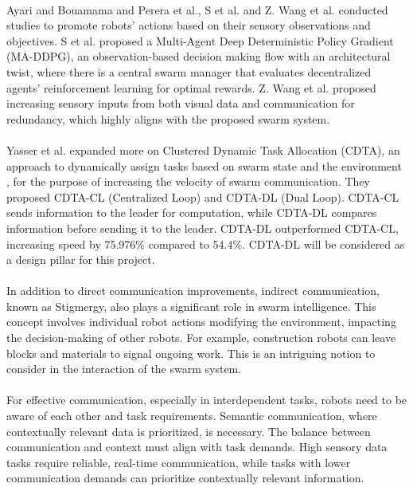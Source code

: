 \paragraph*{}
Ayari and Bouamama\cite{ayari2023evolutionary} and Perera et al.\cite{perera2022integrating}, S et al.\cite{sr2023control} and Z. Wang et al.\cite{wang2024decentralized} conducted studies to promote robots’ actions based on their sensory observations and objectives. S et al.\cite{sr2023control} proposed a Multi-Agent Deep Deterministic Policy Gradient (MA-DDPG), an observation-based decision making flow with an architectural twist, where there is a central swarm manager that evaluates decentralized agents' reinforcement learning for optimal rewards. Z. Wang et al.\cite{wang2024decentralized} proposed increasing sensory inputs from both visual data and communication for redundancy, which highly aligns with the proposed swarm system.

\paragraph*{}
Yasser et al.\cite{yasser2024optimized} expanded more on Clustered Dynamic Task Allocation (CDTA), an approach to dynamically assign tasks based on swarm state and the environment \cite{nedjah2021communication}, for the purpose of increasing the velocity of swarm communication. They proposed CDTA-CL (Centralized Loop) and CDTA-DL (Dual Loop). CDTA-CL sends information to the leader for computation, while CDTA-DL compares information before sending it to the leader. CDTA-DL outperformed CDTA-CL, increasing speed by 75.976\% compared to 54.4\%. CDTA-DL will be considered as a design pillar for this project.

\paragraph*{}
In addition to direct communication improvements, indirect communication, known as Stigmergy, also plays a significant role in swarm intelligence. This concept involves individual robot actions modifying the environment, impacting the decision-making of other robots. For example, construction robots can leave blocks and materials to signal ongoing work\cite{das2024bio}. This is an intriguing notion to consider in the interaction of the swarm system.

\paragraph*{}
For effective communication, especially in interdependent tasks, robots need to be aware of each other and task requirements. Semantic communication, where contextually relevant data is prioritized, is necessary\cite{beck2023swarm}. The balance between communication and context must align with task demands. High sensory data tasks require reliable, real-time communication, while tasks with lower communication demands can prioritize contextually relevant information\cite{zhang2021cooperative}.

